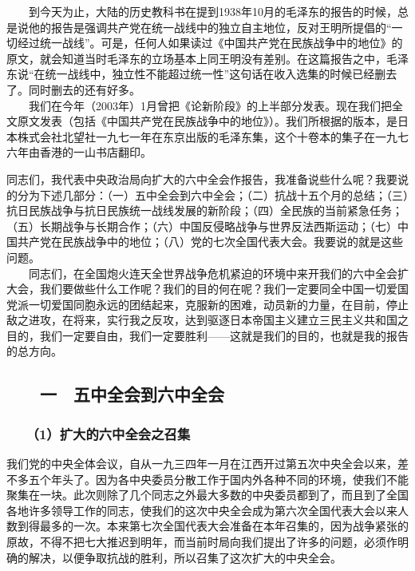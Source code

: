 \documentclass[cn,11pt,chinese]{elegantbook}
\def\myformat#1{\hfil\hfil #1}
\begin{document}
\begin{introduction}
　　到今天为止，大陆的历史教科书在提到1938年10月的毛泽东的报告的时候，总是说他的报告是强调共产党在统一战线中的独立自主地位，反对王明所提倡的“一切经过统一战线”。可是，任何人如果读过《中国共产党在民族战争中的地位》的原文，就会知道当时毛泽东的立场基本上同王明没有差别。在这篇报告之中，毛泽东说“在统一战线中，独立性不能超过统一性”这句话在收入选集的时候已经删去了。同时删去的还有好多。\\
　　我们在今年（2003年）1月曾把《论新阶段》的上半部分发表。现在我们把全文原文发表（包括《中国共产党在民族战争中的地位》）。我们所根据的版本，是日本株式会社北望社一九七一年在东京出版的毛泽东集，这个十卷本的集子在一九七六年由香港的一山书店翻印。
\end{introduction}
同志们，我代表中央政治局向扩大的六中全会作报告，我准备说些什么呢？我要说的分为下述几部分：（一）五中全会到六中全会；（二）抗战十五个月的总结；（三）抗日民族战争与抗日民族统一战线发展的新阶段；（四）全民族的当前紧急任务；（五）长期战争与长期合作；（六）中国反侵略战争与世界反法西斯运动；（七）中国共产党在民族战争中的地位；（八）党的七次全国代表大会。我要说的就是这些问题。\\
　　同志们，在全国炮火连天全世界战争危机紧迫的环境中来开我们的六中全会扩大会，我们要做些什么工作呢？我们的目的何在呢？我们一定要同全中国一切爱国党派一切爱国同胞永远的团结起来，克服新的困难，动员新的力量，在目前，停止敌之进攻，在将来，实行我之反攻，达到驱逐日本帝国主义建立三民主义共和国之目的，我们一定要自由，我们一定要胜利——这就是我们的目的，也就是我的报告的总方向。\\
\subsection*{\myformat{　　一　五中全会到六中全会}}
\subsubsection*{\myformat{　　（1）扩大的六中全会之召集}}
我们党的中央全体会议，自从一九三四年一月在江西开过第五次中央全会以来，差不多五个年头了。因为各中央委员分散工作于国内外各种不同的环境，使我们不能聚集在一块。此次则除了几个同志之外最大多数的中央委员都到了，而且到了全国各地许多领导工作的同志，使我们的这次中央全会成为第六次全国代表大会以来人数到得最多的一次。本来第七次全国代表大会准备在本年召集的，因为战争紧张的原故，不得不把七大推迟到明年，而当前时局向我们提出了许多的问题，必须作明确的解决，以便争取抗战的胜利，所以召集了这次扩大的中央全会。\\
\end{document}
